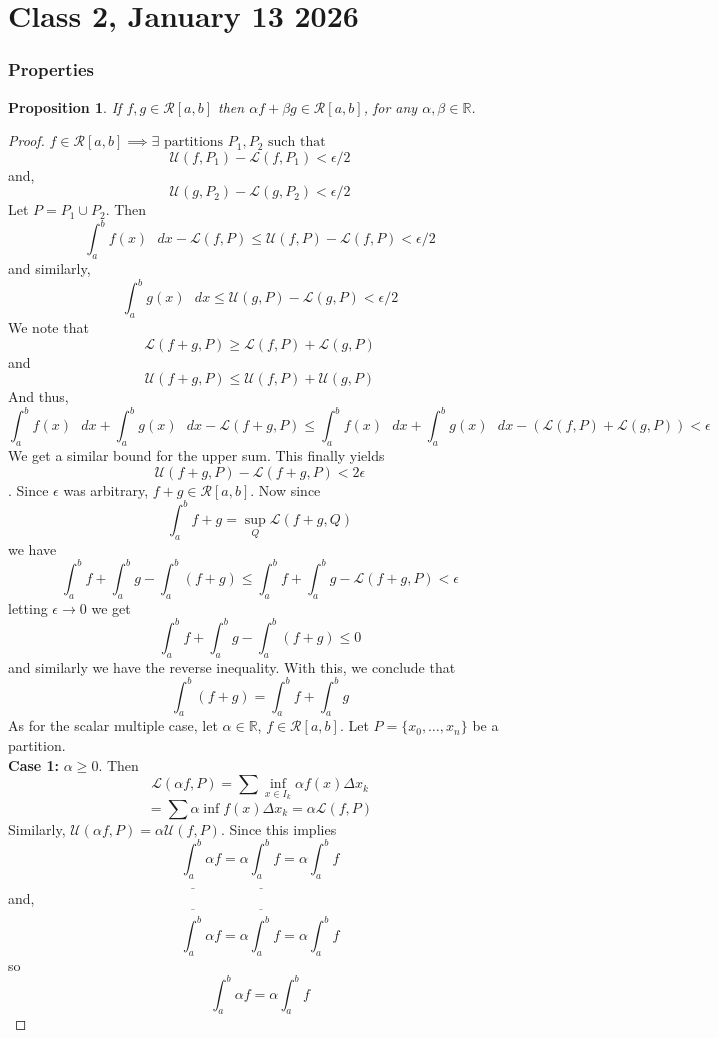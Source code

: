 \documentclass{article}
\newtheorem{proposition}{Proposition}
\begin{document}
\section*{Class 2, January 13 2026}
\subsubsection{Properties}
\begin{proposition}
If $f,g\in \mathcal{R}[a,b]$ then $\alpha f+\beta g\in \mathcal{R}[a,b]$, for any $\alpha,\beta\in \mathbb{R}$.
\end{proposition}
\begin{proof}
$f\in \mathcal{R}[a,b]\implies \exists \text{ partitions } P_1,P_2 \text{ such that }$
$$\mathcal{U}(f,P_1)-\mathcal{L}(f,P_1)<\epsilon/2$$
and,
$$\mathcal{U}(g,P_2)-\mathcal{L}(g,P_2)<\epsilon/2$$
Let $P=P_1\cup P_2$. Then
$$\int_a^b f(x)\text{ }dx-\mathcal{L}(f,P)\leq \mathcal{U}(f,P)-\mathcal{L}(f,P)<\epsilon/2$$
and similarly,
$$\int_a^b g(x)\text{ }dx\leq \mathcal{U}(g,P)-\mathcal{L}(g,P)<\epsilon/2$$
We note that $$\mathcal{L}(f+g,P)\geq \mathcal{L}(f,P)+\mathcal{L}(g,P)$$ and $$\mathcal{U}(f+g,P)\leq \mathcal{U}(f,P)+\mathcal{U}(g,P)$$
And thus,
$$\int_a^b f(x)\text{ }dx+\int_a^b g(x)\text{ }dx-\mathcal{L}(f+g,P)\leq\int_a^b f(x)\text{ }dx+\int_a^b g(x)\text{ }dx-(\mathcal{L}(f,P)+\mathcal{L}(g,P))<\epsilon$$
We get a similar bound for the upper sum. This finally yields
$$\mathcal{U}(f+g,P)-\mathcal{L}(f+g,P)<2\epsilon$$.
Since $\epsilon$ was arbitrary, $f+g\in \mathcal{R}[a,b]$.
Now since 
$$\int_a^b f+g =\sup_{Q}\mathcal{L}(f+g,Q)$$
we have
$$\int_a^b f+\int_a^b g-\int_a^b (f+g)\leq \int_a^b f +\int_a^b g-\mathcal{L}(f+g,P)<\epsilon$$
letting $\epsilon\to 0$ we get 
$$\int_a^b f+\int_a^b g-\int_a^b (f+g)\leq 0$$
and similarly we have the reverse inequality. With this, we conclude that 
$$\int_a^b(f+g)=\int_a^b f+\int_a^b g$$
As for the scalar multiple case, let $\alpha\in \mathbb{R}$, $f\in\mathcal{R}[a,b]$.
Let $P=\{x_0,\dots,x_n\}$ be a partition.\\
\textbf{Case 1:} $\alpha\geq 0$. Then $$\mathcal{L}(\alpha f,P)=\sum \inf_{x\in I_k}\alpha f(x)\Delta x_k$$
$$=\sum \alpha \inf f(x)\Delta x_k=\alpha\mathcal{L}(f,P)$$
Similarly, $\mathcal{U}(\alpha f,P)=\alpha\mathcal{U}(f,P)$. Since this implies
$$\underline{\int_a^b} \alpha f=\alpha\underline{\int_a^b} f=\alpha\int_a^b f$$
and,
$$\overline{\int_a^b}\alpha f=\alpha\overline{\int_a^b} f=\alpha\int_a^b f$$
so $$\int_a^b \alpha f=\alpha\int_a^b f$$


\end{proof}
\end{document}
